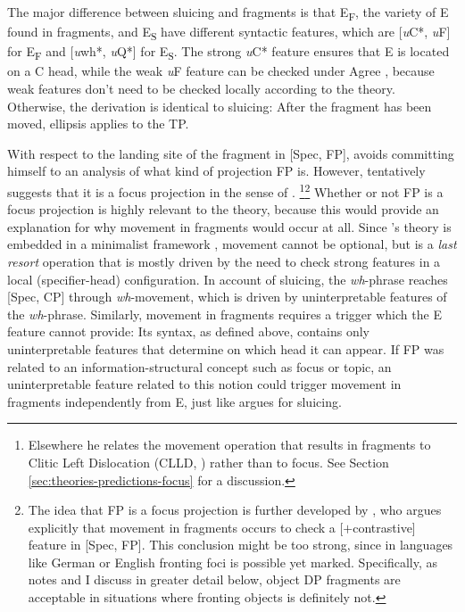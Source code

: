 The major difference between sluicing and fragments is that E\textsubscript{F}, the variety of E found in fragments, and E\textsubscript{S} have different syntactic features, which are [\textit{u}C*, \textit{u}F] for E\textsubscript{F} and [\textit{u}wh*, \textit{u}Q*] for E\textsubscript{S}. The strong \textit{u}C* feature ensures that E is located on a C head, while the weak \textit{u}F feature can be checked under Agree \citep[707]{merchant2004}, because weak features don't need to be checked locally according to the theory. Otherwise, the derivation is identical to sluicing: After the fragment has been moved, ellipsis applies to the TP.

With respect to the landing site of the fragment in [Spec, FP], \citeauthor{merchant2004} avoids committing himself to an analysis of what kind of projection FP is. However, \citet[675]{merchant2004} tentatively suggests that it is a focus projection in the sense of \citet{rizzi1997}.%
%
\footnote{Elsewhere \citep[703]{merchant2004} he relates the movement operation that results in fragments to Clitic Left Dislocation (CLLD, ) rather than to focus. See Section \ref{sec:theories-predictions-focus} for a discussion.
}\footnote{The idea that FP is a focus projection is further developed by \citet{gengel2007}, who argues explicitly that movement in fragments occurs to check a [$+$contrastive] feature in [Spec, FP]. This conclusion might be too strong, since in languages like German or English fronting foci is possible yet marked. Specifically, as \citet{weir2014} notes and I discuss in greater detail below, object DP fragments are acceptable in situations where fronting objects is definitely not.}\afterfn
%
Whether or not FP is a focus projection is highly relevant to the theory, because this would provide an explanation for why movement in fragments would occur at all. Since \citeauthor{merchant2004}'s theory is embedded in a minimalist framework \citep{chomsky1995}, movement cannot be optional, but is a \textit{last resort} operation that is mostly driven by the need to check strong features in a local (specifier-head) configuration. In  account of sluicing, the \textit{wh}-phrase reaches [Spec, CP] through \textit{wh}-movement, which is driven by uninterpretable features of the \textit{wh}-phrase. Similarly, movement in fragments requires a trigger which the E feature cannot provide: Its syntax, as defined above, contains only uninterpretable features that determine on which head it can appear. If FP was related to an information-structural concept such as focus or topic, an uninterpretable feature related to this notion could trigger movement in fragments independently from E, just like \citet{merchant2001} argues for sluicing.

